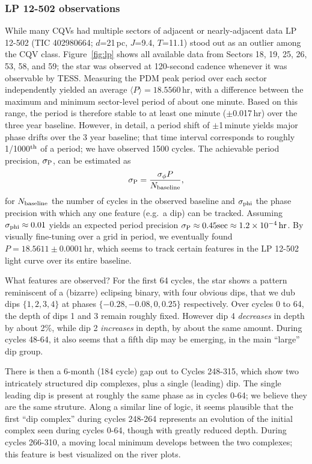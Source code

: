 \documentclass[11pt,twocolumn,tighten]{aastex63}
\begin{document}
\subsubsection{LP 12-502 observations}
While many CQVs had multiple sectors of adjacent or nearly-adjacent data
LP 12-502 (TIC 402980664; $d$=21\,pc, $J$=9.4,
$T$=11.1) stood out as an outlier among the CQV class.
Figure~\ref{fig:lp} shows all available data from Sectors
18, 19, 25, 26, 53, 58, and 59; the star was observed at 120-second
cadence whenever it was observable by TESS.
Measuring the PDM peak period over each sector independently yielded
an average $\langle P \rangle = 18.5560$\,hr, with a difference
between the maximum and minimum sector-level period of about one minute.
Based on this range, the period is therefore stable to at least one
minute ($\pm$0.017\,hr) over the three year baseline.
However, in detail, a period shift of $\pm$1\,minute yields major
phase drifts over the 3 year baseline; that time interval
corresponds to roughly 1/1000$^{\rm th}$ of a period; we have
observed 1500 cycles.
The achievable period precision, $\sigma_{\rm P}$, can be estimated as
\begin{equation}
  \sigma_{\rm P} = \frac { \sigma_{\rm \phi} P } { N_{\rm baseline} },
\end{equation}
for $N_{\rm baseline}$ the number of cycles in the observed baseline and
$\sigma_{\rm phi}$ the phase precision with which any one feature (e.g.~a
dip) can be tracked.
Assuming $\sigma_{\rm phi} \approx 0.01$ yields an expected period precision
$\sigma_{\rm P} \approx 0.45 {\rm sec} \approx 1.2\times 10^{-4}\,{\rm hr}$.
By visually fine-tuning over a grid in period, we eventually 
found $P=18.5611 \pm 0.0001$\,hr, which seems to track certain
features in the LP 12-502 light curve over its entire baseline.

What features are observed?  For the first 64 cycles, the star shows a
pattern reminiscent of a (bizarre) eclipsing binary, with four obvious
dips, that we dub dips $\{ 1, 2, 3, 4 \}$ at phases $\{ -0.28, -0.08,
0, 0.25 \}$ respectively.  Over cycles 0 to 64, the depth of dips 1
and 3 remain roughly fixed.  However dip 4 {\it decreases} in depth by
about 2\%, while dip 2 {\it increases} in depth, by about the same
amount.  During cycles 48-64, it also seems that a fifth dip may be
emerging, in the main ``large'' dip group.

There is then a 6-month (184 cycle) gap out to Cycles 248-315, which
show two intricately structured dip complexes, plus a single (leading)
dip.  The single leading dip is present at roughly the same phase as
in cycles 0-64; we believe they are the same struture.  Along a
similar line of logic, it seems plausible that the first ``dip
complex'' during cycles 248-264 represents an evolution of the initial
complex seen during cycles 0-64, though with greatly reduced depth.
During cycles 266-310, a moving local minimum develops between the two
complexes; this feature is best visualized on the river plots.
\end{document}
